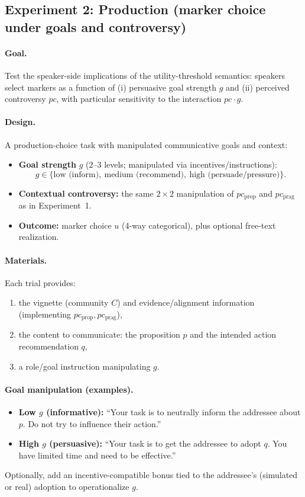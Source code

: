 \documentclass[12pt]{article}
\begin{document}
\subsection{Experiment 2: Production (marker choice under goals and controversy)}

\paragraph{Goal.}
Test the speaker-side implications of the utility-threshold semantics: speakers select markers as a function of (i) persuasive goal strength $g$ and (ii) perceived controversy $pc$, with particular sensitivity to the interaction $pc \cdot g$.

\paragraph{Design.}
A production-choice task with manipulated communicative goals and context:

\begin{itemize}
\item \textbf{Goal strength} $g$ (2--3 levels; manipulated via incentives/instructions):
\[
g \in \{\text{low (inform)},\ \text{medium (recommend)},\ \text{high (persuade/pressure)}\}.
\]
\item \textbf{Contextual controversy:} the same $2\times 2$ manipulation of $pc_{\text{prop}}$ and $pc_{\text{prag}}$ as in Experiment~1.
\item \textbf{Outcome:} marker choice $u$ (4-way categorical), plus optional free-text realization.
\end{itemize}

\paragraph{Materials.}
Each trial provides:
\begin{enumerate}
\item the vignette (community $C$) and evidence/alignment information (implementing $pc_{\text{prop}}, pc_{\text{prag}}$),
\item the content to communicate: the proposition $p$ and the intended action recommendation $q$,
\item a role/goal instruction manipulating $g$.
\end{enumerate}

\paragraph{Goal manipulation (examples).}
\begin{itemize}
\item \textbf{Low $g$ (informative):} ``Your task is to neutrally inform the addressee about $p$. Do not try to influence their action.''
\item \textbf{High $g$ (persuasive):} ``Your task is to get the addressee to adopt $q$. You have limited time and need to be effective.''
\end{itemize}
Optionally, add an incentive-compatible bonus tied to the addressee's (simulated or real) adoption to operationalize $g$.
\end{document}
